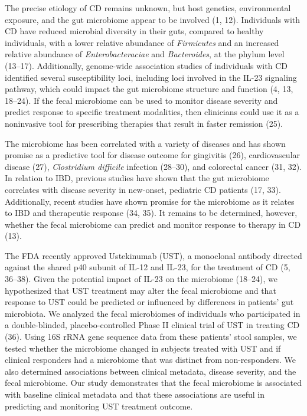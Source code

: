 \documentclass[11pt,]{article}
\begin{document}
The precise etiology of CD remains unknown, but host genetics,
environmental exposure, and the gut microbiome appear to be involved (1,
12). Individuals with CD have reduced microbial diversity in their guts,
compared to healthy individuals, with a lower relative abundance of
\emph{Firmicutes} and an increased relative abundance of
\emph{Enterobacteraciae} and \emph{Bacteroides}, at the phylum level
(13--17). Additionally, genome-wide association studies of individuals
with CD identified several susceptibility loci, including loci involved
in the IL-23 signaling pathway, which could impact the gut microbiome
structure and function (4, 13, 18--24). If the fecal microbiome can be
used to monitor disease severity and predict response to specific
treatment modalities, then clinicians could use it as a noninvasive tool
for prescribing therapies that result in faster remission (25).

The microbiome has been correlated with a variety of diseases and has
shown promise as a predictive tool for disease outcome for gingivitis
(26), cardiovascular disease (27), \emph{Clostridium difficile}
infection (28--30), and colorectal cancer (31, 32). In relation to IBD,
previous studies have shown that the gut microbiome correlates with
disease severity in new-onset, pediatric CD patients (17, 33).
Additionally, recent studies have shown promise for the microbiome as it
relates to IBD and therapeutic response (34, 35). It remains to be
determined, however, whether the fecal microbiome can predict and
monitor response to therapy in CD (13).

The FDA recently approved Ustekinumab (UST), a monoclonal antibody
directed against the shared p40 subunit of IL-12 and IL-23, for the
treatment of CD (5, 36--38). Given the potential impact of IL-23 on the
microbiome (18--24), we hypothesized that UST treatment may alter the
fecal microbiome and that response to UST could be predicted or
influenced by differences in patients' gut microbiota. We analyzed the
fecal microbiomes of individuals who participated in a double-blinded,
placebo-controlled Phase II clinical trial of UST in treating CD (36).
Using 16S rRNA gene sequence data from these patients' stool samples, we
tested whether the microbiome changed in subjects treated with UST and
if clinical responders had a microbiome that was distinct from
non-responders. We also determined associations between clinical
metadata, disease severity, and the fecal microbiome. Our study
demonstrates that the fecal microbiome is associated with baseline
clinical metadata and that these associations are useful in predicting
and monitoring UST treatment outcome.
\end{document}
